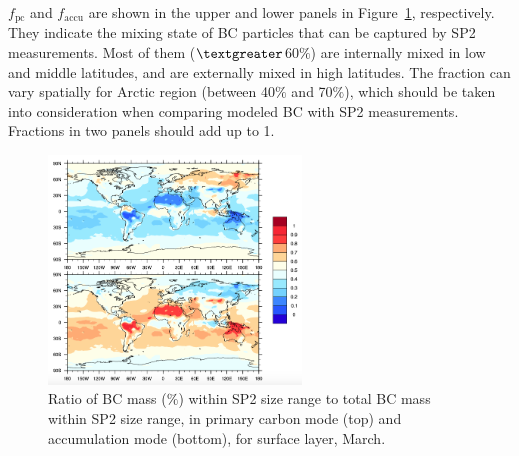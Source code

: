 \documentclass[11pt]{article}
\begin{document}
\noindent $f_{\text{pc}}$ and $f_{\text{accu}}$ are shown in the upper
and lower panels in Figure~\ref{fig_P3}, respectively. They indicate the mixing state of BC particles
that can be captured by SP2 measurements. Most of them
($\textgreater$60$\%$) are internally mixed in low and middle
latitudes, and are externally mixed in high latitudes. The fraction
can vary spatially for Arctic region (between 40$\%$ and 70$\%$),
which should be taken into consideration when comparing modeled BC
with SP2 measurements. Fractions in two panels should add up to 1.


\begin{figure}[!h] 
	\begin{center}
		\includegraphics[width = 0.6\textwidth]{Rplot03}
		\caption[]{\label{fig_P3} Ratio of BC mass ($\%$) within SP2 size range to total BC mass within SP2 size range, in primary carbon mode (top) and accumulation mode (bottom), for surface layer, March.}
	\end{center}
\end{figure}





\clearpage









\end{document}
